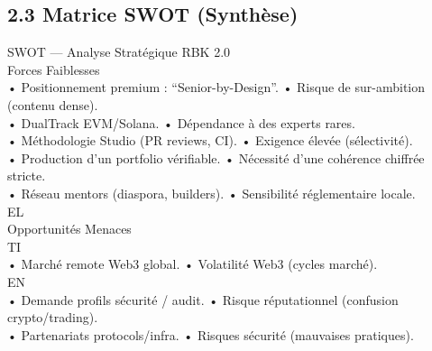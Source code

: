 \subsection{2.3 Matrice SWOT (Synthèse)}
SWOT — Analyse Stratégique RBK 2.0\\
\vspace{0.5em}
\vspace{0.5em}
Forces                                                           Faiblesses\\
• Positionnement premium : “Senior-by-Design”.                    • Risque de sur-ambition (contenu dense).\\
• DualTrack EVM/Solana.                                           • Dépendance à des experts rares.\\
• Méthodologie Studio (PR reviews, CI).                           • Exigence élevée (sélectivité).\\
• Production d’un portfolio vérifiable.                           • Nécessité d’une cohérence chiffrée stricte.\\
• Réseau mentors (diaspora, builders).                            • Sensibilité réglementaire locale.\\
\vspace{0.5em}
\vspace{0.5em}
\vspace{0.5em}
\vspace{0.5em}
EL\\
Opportunités                                                     Menaces\\
\vspace{0.5em}
\vspace{0.5em}
\vspace{0.5em}
\vspace{0.5em}
TI\\
• Marché remote Web3 global.                                      • Volatilité Web3 (cycles marché).\\
\vspace{0.5em}
\vspace{0.5em}
\vspace{0.5em}
\vspace{0.5em}
EN\\
• Demande profils sécurité / audit.                               • Risque réputationnel (confusion crypto/trading).\\
• Partenariats protocols/infra.                                   • Risques sécurité (mauvaises pratiques).\\
\vspace{0.5em}
